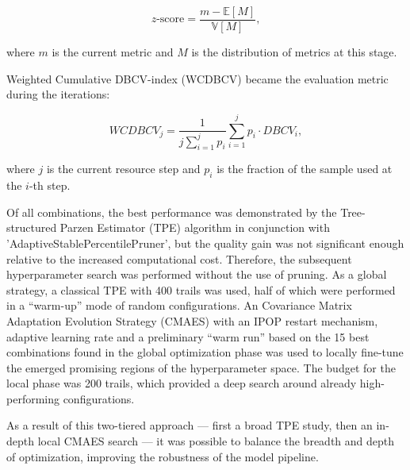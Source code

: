 \begin{equation}\label{eq:z_score}
    z\text{-score}=\frac{m - \mathbb{E}[M]}{\mathbb{V}[M]},
\end{equation}

where $m$ is the current metric and $M$ is the distribution of metrics at this stage.

Weighted Cumulative DBCV-index (WCDBCV) became the evaluation metric during the iterations:

\begin{equation}
    WCDBCV_j=\frac{1}{j\sum_{i=1}^jp_i} \sum_{i=1}^j p_i \cdot DBCV_i,
\end{equation}

where $j$ is the current resource step and $p_i$ is the fraction of the sample used at the $i$-th step.

Of all combinations, the best performance was demonstrated by the  Tree-structured Parzen Estimator (TPE)
algorithm \parencite{TPE2023watanabe, TPEandBO2011bergstra, HPOoverview2015shahriari} in conjunction
with 'AdaptiveStablePercentilePruner', but the quality gain was not significant enough relative
to the increased computational cost. Therefore, the subsequent hyperparameter search was performed
without the use of pruning. As a global strategy, a classical TPE with 400 trails was used, half
of which were performed in a “warm-up” mode of random configurations. An Covariance Matrix Adaptation
Evolution Strategy (CMAES) \parencite{restartCMAES2005auger, CMAES2024nomura} with an IPOP restart mechanism,
adaptive learning rate and a preliminary “warm run” based on the 15 best combinations found in the global
optimization phase \parencite{CMAES2024nomura, lrCMAES2023nomura, restartCMAES2005auger, warmCMAES2021nomura} was
used to locally fine-tune the emerged promising regions of the hyperparameter space. The budget
for the local phase was 200 trails, which provided a deep search around already high-performing
configurations.

As a result of this two-tiered approach — first a broad TPE study, then an in-depth local CMAES
search --- it was possible to balance the breadth and depth of optimization, improving
the robustness of the model pipeline.